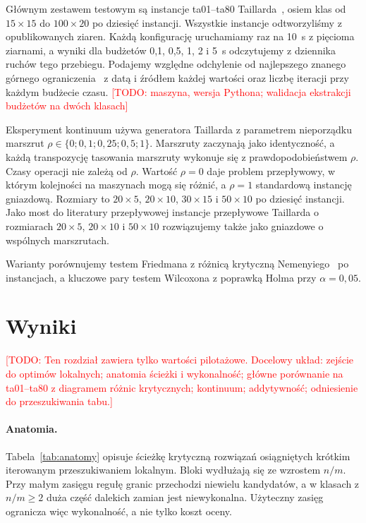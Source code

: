 \documentclass[10pt,twocolumn]{article}
\newcommand{\todo}[1]{\textcolor{red}{[TODO: #1]}}
\begin{document}
Głównym zestawem testowym są instancje ta01--ta80
Taillarda~\cite{taillard1993}, osiem klas od $15\times15$ do
$100\times20$ po dziesięć instancji. Wszystkie instancje odtworzyliśmy
z opublikowanych ziaren. Każdą konfigurację uruchamiamy raz na 10~s
z pięcioma ziarnami, a wyniki dla budżetów 0,1, 0,5, 1, 2 i 5~s
odczytujemy z dziennika ruchów tego przebiegu. Podajemy względne
odchylenie od najlepszego znanego górnego
ograniczenia~\cite{vanhoorn2018} z datą i źródłem każdej wartości oraz
liczbę iteracji przy każdym budżecie czasu. \todo{maszyna, wersja
Pythona; walidacja ekstrakcji budżetów na dwóch klasach}

Eksperyment kontinuum używa generatora Taillarda z parametrem nieporządku
marszrut $\rho\in\{0;0{,}1;0{,}25;0{,}5;1\}$. Marszruty zaczynają jako
identyczność, a każdą transpozycję tasowania marszruty wykonuje się
z prawdopodobieństwem $\rho$. Czasy operacji nie zależą od $\rho$.
Wartość $\rho=0$ daje problem przepływowy, w którym kolejności na
maszynach mogą się różnić, a $\rho=1$ standardową instancję gniazdową.
Rozmiary to $20\times5$, $20\times10$, $30\times15$ i $50\times10$ po
dziesięć instancji. Jako most do literatury przepływowej instancje
przepływowe Taillarda o rozmiarach $20\times5$, $20\times10$
i $50\times10$ rozwiązujemy także jako gniazdowe o wspólnych marszrutach.

Warianty porównujemy testem Friedmana z różnicą krytyczną
Nemenyiego~\cite{demsar2006} po instancjach, a kluczowe pary testem
Wilcoxona z poprawką Holma przy $\alpha=0{,}05$.

\section{Wyniki}\label{sec:exp}

\todo{Ten rozdział zawiera tylko wartości pilotażowe. Docelowy układ:
zejście do optimów lokalnych; anatomia ścieżki i wykonalność; główne
porównanie na ta01--ta80 z diagramem różnic krytycznych; kontinuum;
addytywność; odniesienie do przeszukiwania tabu.}

\paragraph{Anatomia.}
Tabela~\ref{tab:anatomy} opisuje ścieżkę krytyczną rozwiązań osiągniętych
krótkim iterowanym przeszukiwaniem lokalnym. Bloki wydłużają się ze
wzrostem $n/m$. Przy małym zasięgu regułę granic przechodzi niewielu
kandydatów, a w klasach z $n/m\ge2$ duża część dalekich zamian jest
niewykonalna. Użyteczny zasięg ogranicza więc wykonalność, a nie tylko
koszt oceny.
\end{document}
